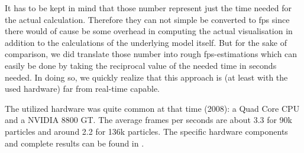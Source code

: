 It has to be kept in mind that those number represent just the time needed for the actual calculation. Therefore they can not simple be converted to fps since there would of cause be some overhead in computing the actual visualisation in addition to the calculations of the underlying model itself. But for the sake of comparison, we did translate those number into rough fps-estimations which can easily be done by taking the reciprocal value of the needed time in seconds needed. In doing so, we quickly realize that this approach is (at least with the used hardware) far from real-time capable.

The utilized hardware was quite common at that time (2008): a Quad Core CPU and a NVIDIA 8800 GT. The average frames per seconds are about 3.3 for 90k particles and around 2.2 for 136k particles. The specific hardware components and complete results can be found in \cite{krivstof2009hydraulic}.




